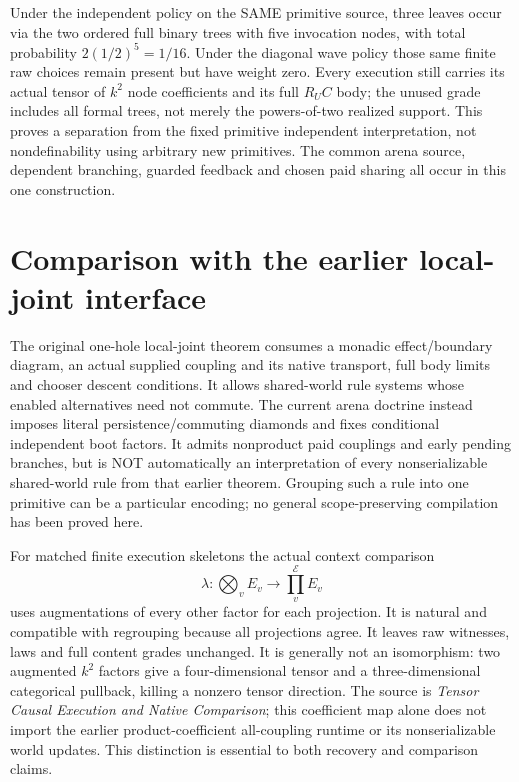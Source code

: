 \documentclass[11pt]{article}
\begin{document}
Under the independent policy on the SAME primitive source, three leaves
occur via the two ordered full binary trees with five invocation nodes,
with total probability $2(1/2)^5=1/16$. Under the diagonal wave policy those
same finite raw choices remain present but have weight zero. Every execution
still carries its actual tensor of $k^2$ node coefficients and its full
$R_U C$ body; the unused grade includes all formal trees, not merely the
powers-of-two realized support. This proves a separation from the fixed
primitive independent interpretation, not nondefinability using arbitrary
new primitives. The common arena source, dependent branching, guarded
feedback and chosen paid sharing all occur in this one construction.

\section{Comparison with the earlier local-joint interface}
The original one-hole local-joint theorem consumes a monadic effect/boundary
diagram, an actual supplied coupling and its native transport, full body
limits and chooser descent conditions. It allows shared-world rule systems
whose enabled alternatives need not commute. The current arena doctrine
instead imposes literal persistence/commuting diamonds and fixes conditional
independent boot factors. It admits nonproduct paid couplings and early
pending branches, but is NOT automatically an interpretation of every
nonserializable shared-world rule from that earlier theorem. Grouping such
a rule into one primitive can be a particular encoding; no general
scope-preserving compilation has been proved here.

For matched finite execution skeletons the actual context comparison
\[
 \lambda:\bigotimes_v E_v\longrightarrow\prod_v^{\mathcal E}E_v
\]
uses augmentations of every other factor for each projection. It is natural
and compatible with regrouping because all projections agree. It leaves raw
witnesses, laws and full content grades unchanged. It is generally not an
isomorphism: two augmented $k^2$ factors give a four-dimensional tensor and
a three-dimensional categorical pullback, killing a nonzero tensor direction.
The source is \emph{Tensor Causal Execution and Native Comparison}; this
coefficient map alone does not import the earlier product-coefficient
all-coupling runtime or its nonserializable world updates. This distinction
is essential to both recovery and comparison claims.
\end{document}
